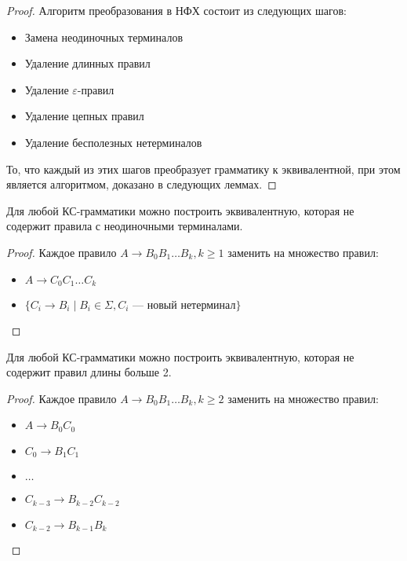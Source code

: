 \begin{proof}
  Алгоритм преобразования в НФХ состоит из следующих шагов:

  \begin{itemize}
    \item Замена неодиночных терминалов
    \item Удаление длинных правил
    \item Удаление $\varepsilon$-правил
    \item Удаление цепных правил
    \item Удаление бесполезных нетерминалов
  \end{itemize}

  То, что каждый из этих шагов преобразует грамматику к эквивалентной, при этом является алгоритмом, доказано в следующих леммах.
\end{proof}

\begin{lemma}
  Для любой КС-грамматики можно построить эквивалентную, которая не содержит правила с неодиночными терминалами.
\end{lemma}

\begin{proof}
  Каждое правило $A \to B_0 B_1 \dots B_k, k \geq 1$ заменить на множество правил:
  \begin{itemize}
    \item $A \to C_0 C_1 \dots C_k$
    \item $\{ C_i \to B_i \mid B_i \in \Sigma, C_i \text{ --- новый нетерминал} \}$
  \end{itemize}
\end{proof}

\begin{lemma}
  Для любой КС-грамматики можно построить эквивалентную, которая не содержит правил длины больше 2.
\end{lemma}

\begin{proof}
  Каждое правило $A \to B_0 B_1 \dots B_k, k \geq 2$ заменить на множество правил:
  \begin{itemize}
    \item $A \to B_0 C_0$
    \item $C_0 \to B_1 C_1$
    \item $\dots$
    \item $C_{k-3} \to B_{k-2} C_{k-2}$
    \item $C_{k-2} \to B_{k-1} B_k$
  \end{itemize}
\end{proof}


